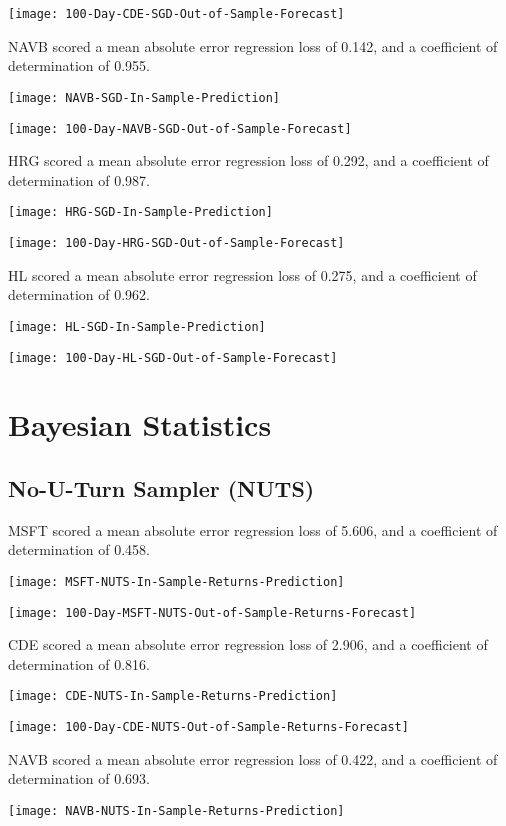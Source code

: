 \texttt{[image: 100-Day-CDE-SGD-Out-of-Sample-Forecast]}

NAVB scored a mean absolute error regression loss of 0.142, and a coefficient of determination of 0.955.

\texttt{[image: NAVB-SGD-In-Sample-Prediction]}

\texttt{[image: 100-Day-NAVB-SGD-Out-of-Sample-Forecast]}

HRG scored a mean absolute error regression loss of 0.292, and a coefficient of determination of 0.987.

\texttt{[image: HRG-SGD-In-Sample-Prediction]}

\texttt{[image: 100-Day-HRG-SGD-Out-of-Sample-Forecast]}

HL scored a mean absolute error regression loss of 0.275, and a coefficient of determination of 0.962.

\texttt{[image: HL-SGD-In-Sample-Prediction]}

\texttt{[image: 100-Day-HL-SGD-Out-of-Sample-Forecast]}

\section{Bayesian Statistics}

\subsection{No-U-Turn Sampler (NUTS)}
MSFT scored a mean absolute error regression loss of 5.606, and a coefficient of determination of 0.458.

\texttt{[image: MSFT-NUTS-In-Sample-Returns-Prediction]}

\texttt{[image: 100-Day-MSFT-NUTS-Out-of-Sample-Returns-Forecast]}

CDE scored a mean absolute error regression loss of 2.906, and a coefficient of determination of 0.816.

\texttt{[image: CDE-NUTS-In-Sample-Returns-Prediction]}

\texttt{[image: 100-Day-CDE-NUTS-Out-of-Sample-Returns-Forecast]}

NAVB scored a mean absolute error regression loss of 0.422, and a coefficient of determination of 0.693.

\texttt{[image: NAVB-NUTS-In-Sample-Returns-Prediction]}

